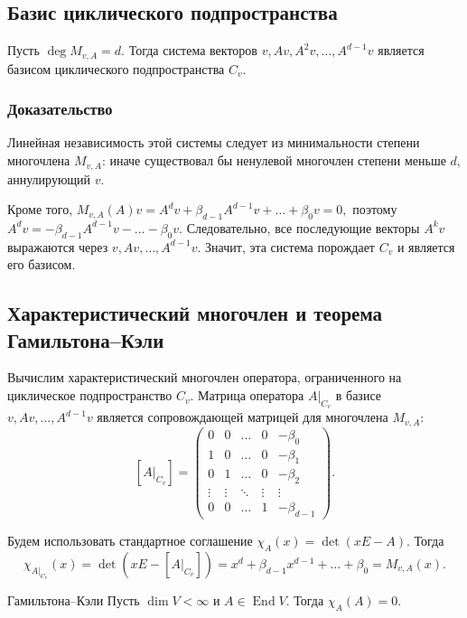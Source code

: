 \subsection{Базис циклического подпространства}

\begin{Proposition}{}{}
	Пусть $\deg M_{v,A} = d$. Тогда система векторов $v, Av, A^2v, \dots, A^{d-1}v$
	является базисом циклического подпространства $C_v$.
\end{Proposition}

\subsubsection*{Доказательство}

Линейная независимость этой системы следует из минимальности степени многочлена $M_{v,A}$: иначе существовал бы ненулевой многочлен степени меньше $d$, аннулирующий $v$.

Кроме того, $M_{v,A}(A)v = A^dv + \beta_{d-1}A^{d-1}v + \dots + \beta_0v = 0,$
поэтому $A^dv = -\beta_{d-1}A^{d-1}v - \dots - \beta_0v.$
Следовательно, все последующие векторы $A^kv$ выражаются через $v, Av, \dots, A^{d-1}v.$
Значит, эта система порождает $C_v$ и является его базисом.

\subsection{Характеристический многочлен и теорема Гамильтона--Кэли}

Вычислим характеристический многочлен оператора, ограниченного на циклическое подпространство $C_v$. Матрица оператора $A|_{C_v}$ в базисе $v, Av, \dots, A^{d-1}v$
является сопровождающей матрицей для многочлена $M_{v,A}$:
\[
[A|_{C_v}] =
\begin{pmatrix}
	0 & 0 & \dots & 0 & -\beta_0 \\
	1 & 0 & \dots & 0 & -\beta_1 \\
	0 & 1 & \dots & 0 & -\beta_2 \\
	\vdots & \vdots & \ddots & \vdots & \vdots \\
	0 & 0 & \dots & 1 & -\beta_{d-1}
\end{pmatrix}.
\]

Будем использовать стандартное соглашение $\chi_A(x) = \det(xE - A).$
Тогда
\[
\chi_{A|_{C_v}}(x)
=
\det(xE - [A|_{C_v}])
=
x^d + \beta_{d-1}x^{d-1} + \dots + \beta_0
=
M_{v,A}(x).
\]

\begin{Theorem}{Гамильтона--Кэли}{}
	Пусть $\dim V < \infty$ и $A \in \operatorname{End} V$. Тогда $\chi_A(A) = 0.$
\end{Theorem}

